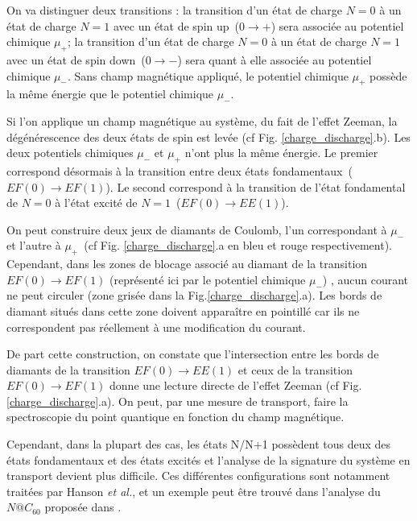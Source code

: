 On va distinguer deux transitions : la transition d'un état de charge $N=0$ à un état de charge $N=1$ avec un état de spin up~($0\rightarrow +$) sera associée au potentiel chimique $\mu_{+}$; la transition d'un état de charge $N=0$ à un état de charge $N=1$ avec un état de spin down~($0\rightarrow -$) sera quant à elle associée au potentiel chimique $\mu_{-}$. Sans champ magnétique appliqué, le potentiel chimique $\mu_{+}$ possède la m\^eme énergie que le potentiel chimique  $\mu_{-}$.

Si l'on applique un champ magnétique au système, du fait de l'effet Zeeman, la dégénérescence des deux états de spin est levée (cf Fig. \ref{charge_discharge}.b). Les deux potentiels chimiques $\mu_{-}$ et $\mu_{+}$ n'ont plus la même énergie. Le premier correspond désormais à la transition entre deux états fondamentaux~($EF(0)\rightarrow EF(1)$). Le second correspond à la transition de l'état fondamental de $N=0$ à l'état excité de $N=1$~($EF(0)\rightarrow EE(1)$).

On peut construire deux jeux de diamants de Coulomb, l'un correspondant à $\mu_{-}$ et l'autre à $\mu_{+}$~(cf Fig. \ref{charge_discharge}.a en bleu et rouge respectivement). Cependant, dans les zones de blocage associé au diamant de la transition $EF(0)\rightarrow EF(1)$ (représenté ici par le potentiel chimique $\mu_{-}$) , aucun courant ne peut circuler (zone grisée dans la Fig.\ref{charge_discharge}.a). Les bords de diamant situés dans cette zone doivent apparaître en pointillé car ils ne correspondent pas réellement à une modification du courant.

De part cette construction, on constate que l'intersection entre les bords de diamants de la transition $EF(0)\rightarrow EE(1)$ et ceux de la transition $EF(0)\rightarrow EF(1)$ donne une lecture directe de l'effet Zeeman (cf Fig. \ref{charge_discharge}.a). On peut, par une mesure de transport, faire la spectroscopie du point quantique en fonction du champ magnétique.

 Cependant, dans la plupart des cas, les états N/N+1 possèdent tous deux des états fondamentaux et des états excités et l'analyse de la signature du système en transport devient plus difficile. Ces différentes configurations sont notamment traitées par Hanson \textit{et al.}, et un exemple peut \^etre trouvé dans l'analyse du $N@C_{60}$ proposée dans \cite{Grose2008}.

